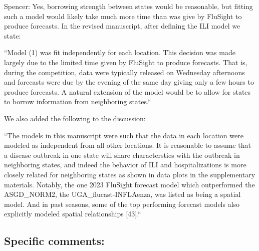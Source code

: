 \documentclass{article}
\newcommand{\spencer}[1]{{\color{blue} Spencer: #1}}
\begin{document}
\begin{enumerate}[1.]
\spencer{Yes, borrowing strength between states would be reasonable, but 
fitting such a model would likely take much more time than was give by FluSight
to produce forecasts. In the revised manuscript, after defining the ILI model
we state:

``Model (1) was fit 
independently for each location. This decision was made largely due to the 
limited time given by FluSight to produce forecasts. That is,
during the competition, data were typically released on Wednesday afternoons and
forecasts were due by the evening of the same day giving only a few hours to 
produce forecasts. A natural extension of the model would be to allow for states
to borrow information from neighboring states.`` 

We also added the following to the discussion:

``The models in this manuscript were such that the data in each
location were modeled as
independent from all other locations. It is reasonable to assume that a
disease outbreak in one state will share characterstics with the outbreak in 
neighboring states, and indeed the behavior of ILI and hospitalizations is more
closely related for neighboring states as shown in data plots in the
supplementary materials. Notably, the one 2023 FluSight forecast model which 
outperformed
the ASGD\_NORM2, the UGA\_flucast-INFLAenza, was listed as being a spatial
model. And in past seasons, some of the top performing forecast models also 
explicitly modeled spatial relationships [43].``}

\end{enumerate}


\subsection*{Specific comments:}
\end{document}
